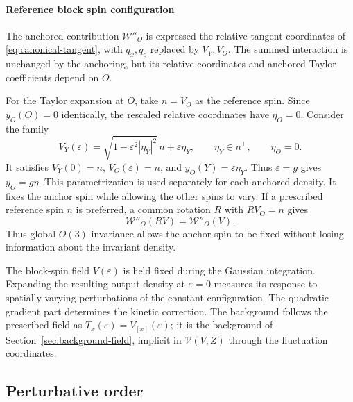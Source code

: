 \documentclass[11pt]{article}
\numberwithin{equation}{section}
\theoremstyle{definition}
\theoremstyle{plain}
\begin{document}
\paragraph{Reference block spin configuration}

The anchored contribution $\mathcal W''_O$ is expressed 
the relative tangent coordinates of \eqref{eq:canonical-tangent}, with $q_x,q_o$ replaced by $V_Y,V_O$.
The summed interaction is unchanged by the anchoring, but its
relative coordinates and anchored Taylor coefficients depend on $O$.  

For the Taylor expansion at $O$, take $n=V_O$ as the reference
spin.  Since $y_O(O)=0$ identically, the rescaled relative
coordinates have $\eta_O=0$.  Consider the family
\begin{equation}
 V_Y(\varepsilon)
   =\sqrt{1-\varepsilon^2|\eta_Y|^2}\,n+\varepsilon\eta_Y,
 \qquad \eta_Y\in n^\perp,\qquad \eta_O=0.
 \label{eq:pert-external-field-family}
\end{equation}
It satisfies $V_Y(0)=n$, $V_O(\varepsilon)=n$, and
$y_O(Y)=\varepsilon\eta_Y$.  Thus $\varepsilon=g$ gives
$y_O=g\eta$.  This parametrization is used separately for each
anchored density.  It fixes the anchor spin while allowing the
other spins to vary.
If a prescribed reference spin $n$ is preferred, a common
rotation $R$ with $RV_O=n$ gives
\begin{equation}
 \mathcal W''_O(RV)=\mathcal W''_O(V).
\end{equation}
Thus global $O(3)$ invariance allows the anchor spin to be fixed
without losing information about the invariant density.

The block-spin field $V(\varepsilon)$ is held fixed during the Gaussian integration.
Expanding the resulting output density at $\varepsilon=0$
measures its response to spatially varying perturbations of the
constant configuration.  The quadratic gradient part determines
the kinetic correction.  The background follows the prescribed
field as $T_x(\varepsilon)=V_{[x]}(\varepsilon)$; it is the
background of Section~\ref{sec:background-field}, implicit in
$\mathcal V(V,Z)$ through the fluctuation coordinates.

\subsection{Perturbative order}
\end{document}
